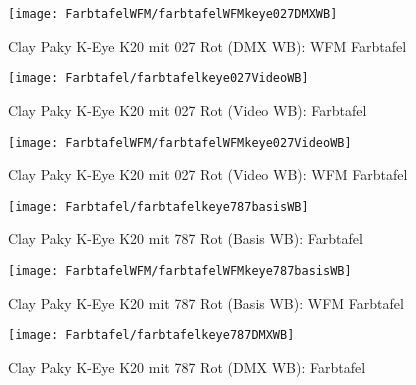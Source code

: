 \documentclass[pagesize,paper=A4,fontsize=12pt,utf8,numbers=noenddot,bibliography=totoc,listof=totoc,DIV=11,BCOR=1mm]{scrreprt}
\begin{document}
\begin{figure}[htp]     %
\centering
\texttt{[image: FarbtafelWFM/farbtafelWFMkeye027DMXWB]} 
\caption {Clay Paky K-Eye K20 mit 027 Rot (DMX WB): WFM Farbtafel} 
\end{figure}

\begin{figure}[htp]     %
\centering
\texttt{[image: Farbtafel/farbtafelkeye027VideoWB]} 
\caption {Clay Paky K-Eye K20 mit 027 Rot (Video WB): Farbtafel} 
\end{figure}

\begin{figure}[htp]     %
\centering
\texttt{[image: FarbtafelWFM/farbtafelWFMkeye027VideoWB]} 
\caption {Clay Paky K-Eye K20 mit 027 Rot (Video WB): WFM Farbtafel} 
\end{figure}



\begin{figure}[htp]     %
\centering
\texttt{[image: Farbtafel/farbtafelkeye787basisWB]} 
\caption {Clay Paky K-Eye K20 mit 787 Rot (Basis WB): Farbtafel} 
\end{figure}

\begin{figure}[htp]     %
\centering
\texttt{[image: FarbtafelWFM/farbtafelWFMkeye787basisWB]} 
\caption {Clay Paky K-Eye K20 mit 787 Rot (Basis WB): WFM Farbtafel} 
\end{figure}

\begin{figure}[htp]     %
\centering
\texttt{[image: Farbtafel/farbtafelkeye787DMXWB]} 
\caption {Clay Paky K-Eye K20 mit 787 Rot (DMX WB): Farbtafel} 
\end{figure}
\end{document}
